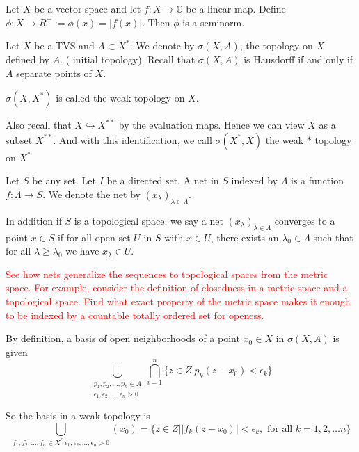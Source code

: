 
\chapter{}

\begin{example}
  Let $X$ be a vector space and let $f: X \to \mathbb{C}$ be a linear
  map. Define $\phi: X \to R^{+} := \phi(x) = |f(x)|$. Then $\phi$ is
  a seminorm.
\end{example}

\begin{remark}
  Let $X$ be a TVS and $A \subset X^{*}$. We denote by $ \sigma(X,
  A)$, the topology on $X$ defined by $A$. ( initial topology).
  Recall that $\sigma(X, A)$ is Hausdorff if and only if $A$ separate
  points of $X$.

  $\sigma(X, X^{*})$ is called the weak topology on $X$.

  Also recall that $X \hookrightarrow X^{**}$ by the evaluation maps.
  Hence we can view $X$ as a subset $X^{**}$. And with this
  identification, we call $\sigma(X^{*}, X)$ the weak $*$ topology on $X^{*}$

\end{remark}

\begin{definition}
  Let $S$ be any set. Let $I$ be a directed set. A net in $S$ indexed
  by $\Lambda$ is a function $f:\Lambda \to S$. We denote the net by
  $(x_\lambda)_{\lambda \in \Lambda}$.

  In addition if $S$ is a topological space, we say a net
  $(x_\lambda)_{\lambda \in \Lambda}$ converges to a point $x \in S$
  if  for all open set $U$ in $S$ with $x \in U$, there exists an
  $\lambda_0 \in \Lambda$ such that for all $\lambda \ge \lambda_0$
  we have $x_\lambda \in U$.
\end{definition}

\textcolor{red}{See how nets generalize the sequences to topological
  spaces from the metric space. For example, consider the definition of
  closedness in a metric space and a topological space. Find what exact
  property of the metric space makes it enough to be indexed by a
countable totally ordered set for openess.}

\begin{remark}
  By definition, a basis of open neighborhoods of a point $x_0 \in X$
  in $\sigma(X, A)$ is given \[
    \bigcup_{\substack{p_1 , p_2 , \ldots , p_n \in A \\ \epsilon_1 ,
    \epsilon_2 , \ldots , \epsilon_n > 0}}\bigcap_{i = 1}^{n} \{ z
    \in Z | p_k(z-x_0) < \epsilon_k \}
  \]

  So the basis in a weak topology is \[
    \bigcup_{f_1 , f_2 , \ldots , f_n \in X^{*} \ \epsilon_1 ,
    \epsilon_2 , \ldots , \epsilon_n > 0}(x_0) = \{  z \in Z \Big|
    |f_k(z- x_0)|< \epsilon_k, \textrm{ for all } k = 1, 2, \ldots n \}
  \]
\end{remark}

